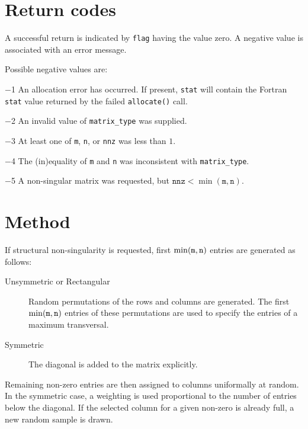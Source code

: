 \documentclass{spral}
\begin{document}

\section{Return codes} \label{errors}

A successful return is indicated by
{\tt flag} having the value zero.
A negative value is associated with an error message.

Possible negative values are:

\begin{description}
\item{$-$1} An allocation error has occurred. If present, {\tt stat} will
   contain the Fortran {\tt stat} value returned by the failed {\tt allocate()}
   call.
\item{$-$2} An invalid value of {\tt matrix\_type} was supplied.
\item{$-$3} At least one of {\tt m}, {\tt n}, or {\tt nnz} was less than $1$.
\item{$-$4} The (in)equality of {\tt m} and {\tt n} was inconsistent with
   {\tt matrix\_type}.
\item{$-$5} A non-singular matrix was requested, but $\texttt{nnz}<\min(\texttt{m},\texttt{n})$.
\end{description}

\section{Method} \label{method}

If structural non-singularity is requested, first $\min({\tt m}, {\tt n})$ entries are generated as follows:
\begin{description}
   \item[Unsymmetric or Rectangular] Random permutations of the rows and
      columns are generated. The first $\min({\tt m}, {\tt n})$ entries of
      these permutations are used to specify the entries of a maximum
      transversal.
   \item[Symmetric] The diagonal is added to the matrix explicitly.
\end{description}

Remaining non-zero entries are then assigned to columns uniformally at
random. In the symmetric case, a weighting is used proportional to the number of
entries below the diagonal. If the selected column for a given non-zero is 
already full, a new random sample is drawn.
\end{document}
